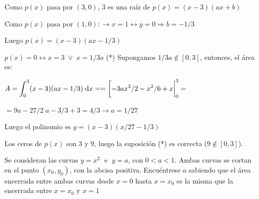 \begin{proofw}\renewcommand{\qedsymbol}{$\diamond$}

Como $p(x)$ pasa por $(3,0)$, $3$ es una raíz de $p(x)=(x-3)(ax+b)$

Como $p(x)$ pasa por $(1,0):\to x=1 \leftrightarrow y=0 \Rightarrow b=-1/3$

Luego $p(x)=(x-3)(ax-1/3)$

$p(x)=0 \leftrightarrow x=3 \; \vee \; x=1/{3a}$ (*) Supongamos $1/{3a} \notin [0,3]$, entonces, el área es:

$A=\displaystyle \int_0^3 (x-3)(ax-1/3)\; \dd x = =\eval[-3ax^2/2-x^2/6+x|_0^3= $

$=9a-27/2\; a-3/3+3 = 4/3 \to a=1/27$

Luego el polinomio es $y=(x-3)(x/27 - 1/3)$

\textcolor{gris}{Los ceros de $p(x)$ son $3$ y $9$, luego la suposición (*) es correcta ($9 \notin [0,3]$).}
	
\end{proofw}

\begin{ejre}
Se consideran las curvas $y=x^2\; $ e $\; y=a$, con $0<a<1$. Ambas curvas se cortan en el punto $(x_0,y_0)$, con la abcisa positiva. Encuéntrese $a$ sabiendo que el área encerrada entre ambas curvas desde $x=0$ hasta $x=x_0$ es la misma que la encerrada entre $x=x_0$ y $x=1$	
	
\end{ejre}


